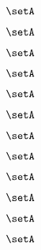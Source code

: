 {\begin{forslides}
        \begin{equation}
            \label{eq:slides-translation-155}
            \setA
        \end{equation}

        \begin{equation}
            \label{eq:slides-translation-156}
            \setA
        \end{equation}

        \begin{equation}
            \label{eq:slides-translation-157}
            \setA
        \end{equation}

        \begin{equation}
            \label{eq:slides-translation-158}
            \setA
        \end{equation}

        \begin{equation}
            \label{eq:slides-translation-159}
            \setA
        \end{equation}

        \begin{equation}
            \label{eq:slides-translation-160}
            \setA
        \end{equation}

        \begin{equation}
            \label{eq:slides-translation-161}
            \setA
        \end{equation}

        \begin{equation}
            \label{eq:slides-translation-162}
            \setA
        \end{equation}

        \begin{equation}
            \label{eq:slides-translation-163}
            \setA
        \end{equation}

        \begin{equation}
            \label{eq:slides-translation-164}
            \setA
        \end{equation}

        \begin{equation}
            \label{eq:slides-translation-165}
            \setA
        \end{equation}

        \begin{equation}
            \label{eq:slides-translation-166}
            \setA
        \end{equation}


\end{forslides}}
